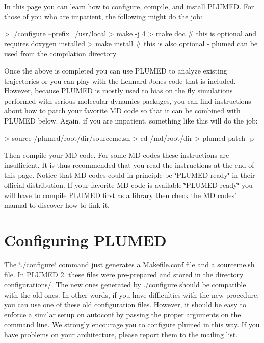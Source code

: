In this page you can learn how to \hyperlink{_installation_ConfiguringPlumed}{configure}, \hyperlink{_installation_CompilingPlumed}{compile}, and \hyperlink{_installation_InstallingPlumed}{install} P\+L\+U\+M\+E\+D. For those of you who are impatient, the following might do the job\+: \begin{DoxyVerb}> ./configure --prefix=/usr/local
> make -j 4
> make doc # this is optional and requires doxygen installed
> make install # this is also optional - plumed can be used from the compilation directory
\end{DoxyVerb}


Once the above is completed you can use P\+L\+U\+M\+E\+D to analyze existing trajectories or you can play with the Lennard-\/\+Jones code that is included. However, because P\+L\+U\+M\+E\+D is mostly used to bias on the fly simulations performed with serious molecular dynamics packages, you can find instructions about how to \hyperlink{_installation_Patching}{patch } your favorite M\+D code so that it can be combined with P\+L\+U\+M\+E\+D below. Again, if you are impatient, something like this will do the job\+: \begin{DoxyVerb}> source /plumed/root/dir/sourceme.sh
> cd /md/root/dir
> plumed patch -p
\end{DoxyVerb}
 Then compile your M\+D code. For some M\+D codes these instructions are insufficient. It is thus recommended that you read the instructions at the end of this page. Notice that M\+D codes could in principle be \char`\"{}\+P\+L\+U\+M\+E\+D ready\char`\"{} in their official distribution. If your favorite M\+D code is available \char`\"{}\+P\+L\+U\+M\+E\+D ready\char`\"{} you will have to compile P\+L\+U\+M\+E\+D first as a library then check the M\+D codes' manual to discover how to link it.\hypertarget{_installation_ConfiguringPlumed}{}\section{Configuring P\+L\+U\+M\+E\+D}\label{_installation_ConfiguringPlumed}
The \char`\"{}./configure\char`\"{} command just generates a Makefile.\+conf file and a sourceme.\+sh file. In P\+L\+U\+M\+E\+D 2. these files were pre-\/prepared and stored in the directory configurations/. The new ones generated by ./configure should be compatible with the old ones. In other words, if you have difficulties with the new procedure, you can use one of these old configuration files. However, it should be easy to enforce a similar setup on autoconf by passing the proper arguments on the command line. We strongly encourage you to configure plumed in this way. If you have problems on your architecture, please report them to the mailing list.

